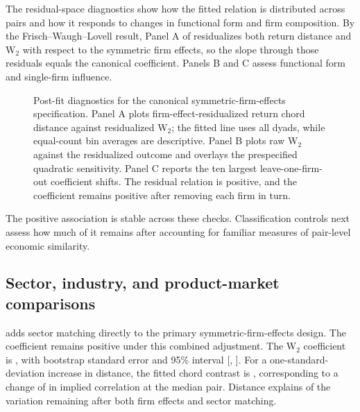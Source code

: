 

The residual-space diagnostics show how the fitted relation is distributed
across pairs and how it responds to changes in functional form and firm composition.
By the Frisch--Waugh--Lovell result, Panel A of
 residualizes both return distance and
W$_2$ with respect to the symmetric firm effects, so the slope through those
residuals equals the canonical coefficient.
Panels B and C assess functional form and single-firm influence.

\begin{figure}[H]
  \centering
  \caption{Post-fit diagnostics for the canonical
    symmetric-firm-effects specification.
    Panel A plots firm-effect-residualized return chord distance against
    residualized W$_2$; the fitted line uses all dyads, while equal-count bin
    averages are descriptive.
    Panel B plots raw W$_2$ against the residualized outcome and overlays the
    prespecified quadratic sensitivity.
    Panel C reports the ten largest leave-one-firm-out coefficient shifts.
    The residual relation is positive, and the coefficient remains
    positive after removing each firm in turn.
  }
  \label{fig:dyadic-postfit-diagnostics}
\end{figure}

The positive association is stable across these checks.
Classification controls next assess how much of it remains after accounting
for familiar measures of pair-level economic similarity.

\subsection{Sector, industry, and product-market
comparisons}\label{sec:classification-controls}

 adds sector matching directly to the
primary symmetric-firm-effects design.
The coefficient remains positive under this combined adjustment.
The W$_2$ coefficient is , with
bootstrap standard error  and 95\%
interval [,
].
For a one-standard-deviation increase in distance, the fitted chord contrast
is , corresponding to a change
of  in implied correlation
at the median pair.
Distance explains  of the
variation remaining after both firm effects and sector matching.

